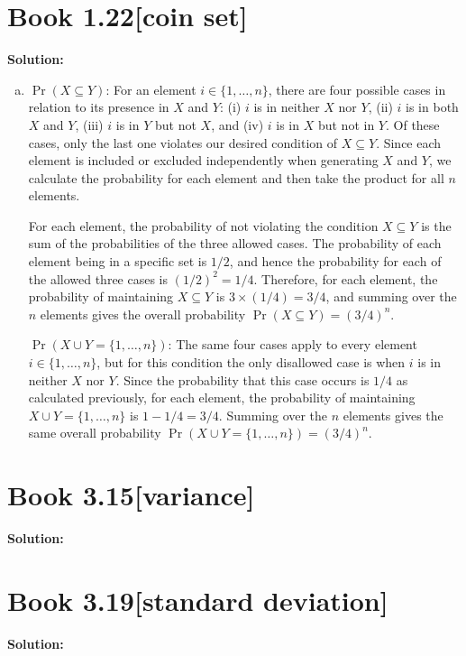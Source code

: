\documentclass[11pt]{article}
\newenvironment{question}[2]
{\newpage\section{#1\texorpdfstring{\hfill}{horizontal spacing}{\rm\normalsize #2}}}{}
\newenvironment{solution}
{\textbf{Solution: }\color{blue}}
{\color{black}}
\begin{document}
\begin{question}{Book 1.22}{[coin set]}
\begin{solution}
\begin{enumerate}[(a)]
    \item \(\Pr(X \subseteq Y)\): For an element \(i \in \{1,\ldots,n\}\), there are four possible cases in relation to its presence in \(X\) and \(Y\): (i) \(i\) is in neither \(X\) nor \(Y\), (ii) \(i\) is in both \(X\) and \(Y\), (iii) \(i\) is in \(Y\) but not \(X\), and (iv) \(i\) is in \(X\) but not in \(Y\). Of these cases, only the last one violates our desired condition of \(X \subseteq Y\). Since each element is included or excluded independently when generating \(X\) and \(Y\), we calculate the probability for each element and then take the product for all \(n\) elements.

    For each element, the probability of not violating the condition \(X \subseteq Y\) is the sum of the probabilities of the three allowed cases. The probability of each element being in a specific set is \(1/2\), and hence the probability for each of the allowed three cases is \((1/2)^2=1/4\). Therefore, for each element, the probability of maintaining \(X \subseteq Y\) is \(3 \times (1/4)=3/4\), and summing over the \(n\) elements gives the overall probability \(\Pr(X \subseteq Y)=(3/4)^n\).

    \(\Pr(X \cup Y = \{1,\ldots,n\})\): The same four cases apply to every element \(i \in \{1,\ldots,n\}\), but for this condition the only disallowed case is when \(i\) is in neither \(X\) nor \(Y\). Since the probability that this case occurs is \(1/4\) as calculated previously, for each element, the probability of maintaining \(X \cup Y = \{1,\ldots,n\}\) is \(1-1/4=3/4\). Summing over the \(n\) elements gives the same overall probability \(\Pr(X \cup Y = \{1,\ldots,n\})=(3/4)^n\).
\end{enumerate}

\end{solution}
\end{question}


\begin{question}{Book 3.15}{[variance]}


\begin{solution}


\end{solution}
\end{question}


\begin{question}{Book 3.19}{[standard deviation]}


\begin{solution}


\end{solution}
\end{question}
\end{document}
